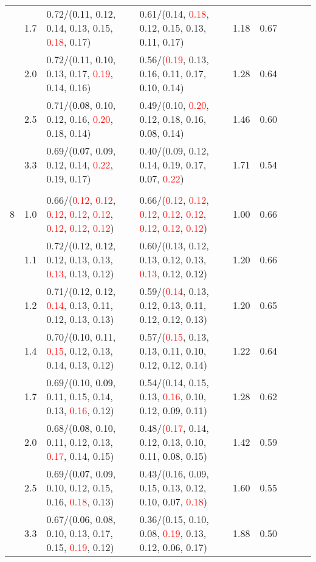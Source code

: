 \documentclass[10pt,a4paper]{report}
\begin{document}
\begin{table}[!htbp]
\begin{center}
{\begin{tabular}{ccllccccc}
			&1.7&0.72/(\textcolor{black}{0.11}, 0.12, 0.14, 0.13, 0.15, \textcolor{red}{0.18}, 0.17)&0.61/(0.14, \textcolor{red}{0.18}, 0.12, 0.15, 0.13, \textcolor{black}{0.11}, 0.17)&1.18&0.67\\
			&2.0&0.72/(0.11, \textcolor{black}{0.10}, 0.13, 0.17, \textcolor{red}{0.19}, 0.14, 0.16)&0.56/(\textcolor{red}{0.19}, 0.13, 0.16, 0.11, 0.17, \textcolor{black}{0.10}, 0.14)&1.28&0.64\\
			&2.5&0.71/(\textcolor{black}{0.08}, 0.10, 0.12, 0.16, \textcolor{red}{0.20}, 0.18, 0.14)&0.49/(0.10, \textcolor{red}{0.20}, 0.12, 0.18, 0.16, \textcolor{black}{0.08}, 0.14)&1.46&0.60\\
			&3.3&0.69/(\textcolor{black}{0.07}, 0.09, 0.12, 0.14, \textcolor{red}{0.22}, 0.19, 0.17)&0.40/(0.09, 0.12, 0.14, 0.19, 0.17, \textcolor{black}{0.07}, \textcolor{red}{0.22})&1.71&0.54\\
			&&&&\\
			8			&1.0&0.66/(\textcolor{red}{0.12}, \textcolor{red}{0.12}, \textcolor{red}{0.12}, \textcolor{red}{0.12}, \textcolor{red}{0.12}, \textcolor{red}{0.12}, \textcolor{red}{0.12}, \textcolor{red}{0.12})&0.66/(\textcolor{red}{0.12}, \textcolor{red}{0.12}, \textcolor{red}{0.12}, \textcolor{red}{0.12}, \textcolor{red}{0.12}, \textcolor{red}{0.12}, \textcolor{red}{0.12}, \textcolor{red}{0.12})&1.00&0.66\\
			&1.1&0.72/(0.12, \textcolor{black}{0.12}, 0.12, 0.13, 0.13, \textcolor{red}{0.13}, 0.13, 0.12)&0.60/(0.13, 0.12, 0.13, 0.12, 0.13, \textcolor{red}{0.13}, 0.12, \textcolor{black}{0.12})&1.20&0.66\\
			&1.2&0.71/(0.12, 0.12, \textcolor{red}{0.14}, 0.13, \textcolor{black}{0.11}, 0.12, 0.13, 0.13)&0.59/(\textcolor{red}{0.14}, 0.13, 0.12, 0.13, \textcolor{black}{0.11}, 0.12, 0.12, 0.13)&1.20&0.65\\
			&1.4&0.70/(\textcolor{black}{0.10}, 0.11, \textcolor{red}{0.15}, 0.12, 0.13, 0.14, 0.13, 0.12)&0.57/(\textcolor{red}{0.15}, 0.13, 0.13, 0.11, \textcolor{black}{0.10}, 0.12, 0.12, 0.14)&1.22&0.64\\
			&1.7&0.69/(0.10, \textcolor{black}{0.09}, 0.11, 0.15, 0.14, 0.13, \textcolor{red}{0.16}, 0.12)&0.54/(0.14, 0.15, 0.13, \textcolor{red}{0.16}, 0.10, 0.12, \textcolor{black}{0.09}, 0.11)&1.28&0.62\\
			&2.0&0.68/(\textcolor{black}{0.08}, 0.10, 0.11, 0.12, 0.13, \textcolor{red}{0.17}, 0.14, 0.15)&0.48/(\textcolor{red}{0.17}, 0.14, 0.12, 0.13, 0.10, 0.11, \textcolor{black}{0.08}, 0.15)&1.42&0.59\\
			&2.5&0.69/(\textcolor{black}{0.07}, 0.09, 0.10, 0.12, 0.15, 0.16, \textcolor{red}{0.18}, 0.13)&0.43/(0.16, 0.09, 0.15, 0.13, 0.12, 0.10, \textcolor{black}{0.07}, \textcolor{red}{0.18})&1.60&0.55\\
			&3.3&0.67/(\textcolor{black}{0.06}, 0.08, 0.10, 0.13, 0.17, 0.15, \textcolor{red}{0.19}, 0.12)&0.36/(0.15, 0.10, 0.08, \textcolor{red}{0.19}, 0.13, 0.12, \textcolor{black}{0.06}, 0.17)&1.88&0.50\\
			\bottomrule
		\end{tabular}}
	\end{center}
\end{table}
\end{document}
